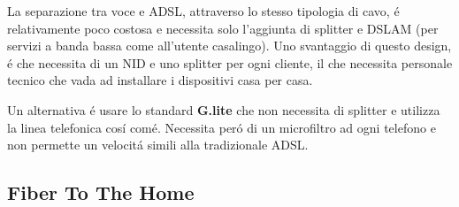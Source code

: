 \documentclass[../ComputerNetworks.tex]{subfiles}
\begin{document}
La separazione tra voce e ADSL, attraverso lo stesso tipologia di cavo, é relativamente poco costosa e necessita solo l’aggiunta di splitter e DSLAM (per servizi a banda bassa come all’utente casalingo).
Uno svantaggio di questo design, é che necessita di un NID e uno splitter per ogni cliente, il che necessita personale tecnico che vada ad installare i dispositivi casa per casa.

Un alternativa é usare lo standard \textbf{G.lite} che non necessita di splitter e utilizza la linea telefonica cosí comé.
Necessita peró di un microfiltro ad ogni telefono e non permette un velocitá simili alla tradizionale ADSL.

\subsection{Fiber To The Home}





\biblio
\end{document}
